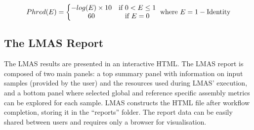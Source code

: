 \begin{equation} \label{ch5_eq1}
    Phred(E) = \left\{\begin{matrix}
-log(E)\times 10 & \textup{if } 0 < E \leq 1\\
 60 & \textup{if }E = 0
\end{matrix}\right. \\
\textup{ where }E = 1-\textup{Identity}
\end{equation}

\subsection{The LMAS Report}

The LMAS results are presented in an interactive HTML. The LMAS report is composed of two main panels: a top summary panel with information on input samples (provided by the user) and the resources used during LMAS’ execution, and a bottom panel where selected global and reference specific assembly metrics can be explored for each sample. LMAS constructs the HTML file after workflow completion, storing it in the “reports” folder. The report data can be easily shared between users and requires only a browser for visualisation.

